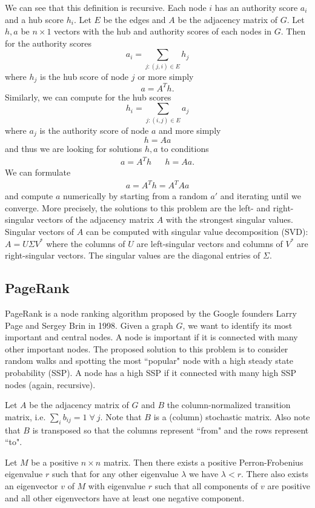 We can see that this definition is recursive. Each node $i$ has an authority score $a_i$ and a hub score $h_i$. Let $E$ be the edges and $A$ be the adjacency matrix of $G$. Let $h, a$ be $n \times 1$ vectors with the hub and authority scores of each nodes in $G$. Then for the authority scores
$$
a_i = \sum_{j: (j,i) \in E} h_j
$$
where $h_j$ is the hub score of node $j$ or more simply
$$
a = A^T h.
$$
Similarly, we can compute for the hub scores
$$
h_i = \sum_{j: (i,j) \in E} a_j
$$
where $a_j$ is the authority score of node $a$ and more simply
$$
h = A a
$$
and thus we are looking for solutions $h,a$ to conditions
\begin{align*}
    a = A^T h && h = A a.
\end{align*}
We can formulate
\begin{align*}
    a = A^T h = A^T A a
\end{align*}
and compute $a$ numerically by starting from a random $a'$ and iterating until we converge. More precisely, the solutions to this problem are the left- and right-singular vectors of the adjacency matrix $A$ with the strongest singular values. Singular vectors of $A$ can be computed with singular value decomposition (SVD): $A = U \Sigma V^*$ where the columns of $U$ are left-singular vectors and columns of $V^*$ are right-singular vectors. The singular values are the diagonal entries of $\Sigma$.

\subsection{PageRank}
\bigskip

PageRank is a node ranking algorithm proposed by the Google founders Larry Page and Sergey Brin in 1998. Given a graph $G$, we want to identify its most important and central nodes. A node is important if it is connected with many other important nodes. The proposed solution to this problem is to consider random walks and spotting the most ``popular" node with a high steady state probability (SSP). A node has a high SSP if it connected with many high SSP nodes (again, recursive).

Let $A$ be the adjacency matrix of $G$ and $B$ the column-normalized transition matrix, i.e. $\sum_i b_{ij} = 1 \; \forall \ j$. Note that $B$ is a (column) stochastic matrix. Also note that $B$ is transposed so that the columns represent ``from" and the rows represent ``to".

\bigskip

\begin{theorem}
Let $M$ be a positive $n \times n$ matrix. Then there exists a positive Perron-Frobenius eigenvalue $r$ such that for any other eigenvalue $\lambda$ we have $\lambda < r$. There also exists an eigenvector $v$ of $M$ with eigenvalue $r$ such that all components of $v$ are positive and all other eigenvectors have at least one negative component.
\end{theorem}

